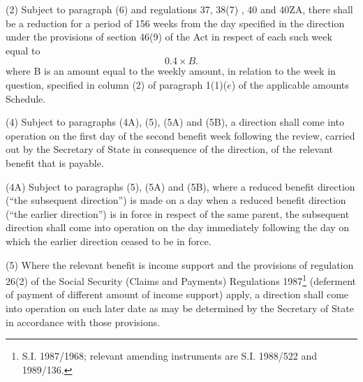 \documentclass[a4paper,12pt]{article}
\begin{document}
(2) Subject to paragraph (6) and regulations 37, 38(7)%
, 40 and 40ZA,  %
there shall be a reduction for a period of 
156 weeks  %
from the day specified in the direction under the provisions of section 46(9) of the Act in respect of each such week equal to
\[0.4 \times B.\]  %
where B is an amount equal to the weekly amount, in relation to the week in question, specified in column (2) of paragraph 1(1)($e$) of the applicable amounts Schedule.



(4) 
Subject to paragraphs 
(4A),  %
(5), (5A) and (5B),  %
a direction shall come into operation on the first day of the second benefit week following the review, carried out by 
the Secretary of State  %
in consequence of the direction, of the relevant benefit that is payable.

(4A) Subject to paragraphs (5), (5A) and (5B), where a reduced benefit direction (“the subsequent direction”) is made on a day when a reduced benefit direction (“the earlier direction”) is in force in respect of the same parent, the subsequent direction shall come into operation on the day immediately following the day on which the earlier direction ceased to be in force.

(5) Where the relevant benefit is income support and the provisions of regulation 26(2) of the Social Security (Claims and Payments) Regulations 1987\footnote{\frenchspacing S.I. 1987/1968; relevant amending instruments are S.I. 1988/522 and 1989/136.} (deferment of payment of different amount of income support) apply, a direction shall come into operation on such later date as may be determined by the Secretary of State in accordance with those provisions.
\end{document}
